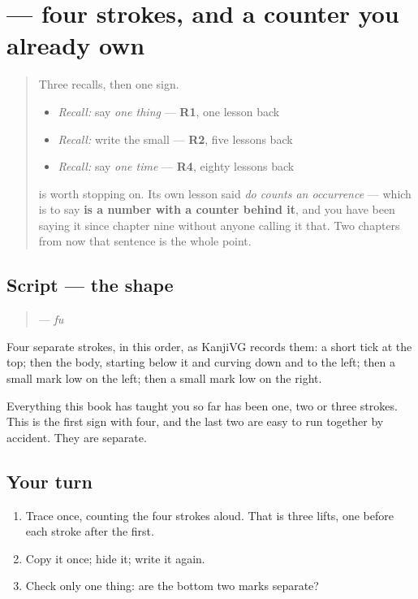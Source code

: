 \section[\texorpdfstring{\ja{ふ} (fu)}{ふ (fu)}]{ — four strokes, and a counter you already own}

\label{lesson:JA-W16-fu}



\begin{quote}
Three recalls, then one sign.

\begin{itemize}
\raggedright
  \item \emph{Recall:} say \emph{one thing} — \textbf{R1}, one lesson back
  \item \emph{Recall:} write the small \textbf{} — \textbf{R2}, five lessons back
  \item \emph{Recall:} say \emph{one time} — \textbf{R4}, eighty lessons back
\end{itemize}

\textbf{} is worth stopping on. Its own lesson said \emph{do counts an occurrence} — which is to say \textbf{ is a number with a counter behind it}, and you have been saying it since chapter nine without anyone calling it that. Two chapters from now that sentence is the whole point.
\end{quote}

\subsection*{Script — the shape}

\begin{quote}
\textbf{} — \emph{fu}
\end{quote}

Four separate strokes, in this order, as KanjiVG records them: a short tick at the top; then the body, starting below it and curving down and to the left; then a small mark low on the left; then a small mark low on the right.

Everything this book has taught you so far has been one, two or three strokes. This is the first sign with four, and the last two are easy to run together by accident. They are separate.

\subsection*{Your turn}
\begin{enumerate}
\raggedright
  \item Trace \textbf{} once, counting the four strokes aloud. That is three lifts, one before each stroke after the first.
  \item Copy it once; hide it; write it again.
  \item Check only one thing: are the bottom two marks separate?
\end{enumerate}


